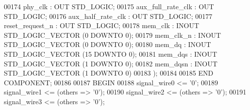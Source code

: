 \begin{DoxyCode}
{00174         phy_clk : \textcolor{keywordflow}{OUT} \textcolor{comment}{STD\_LOGIC};
00175         aux_full_rate_clk   : \textcolor{keywordflow}{OUT} \textcolor{comment}{STD\_LOGIC};
00176         aux_half_rate_clk   : \textcolor{keywordflow}{OUT} \textcolor{comment}{STD\_LOGIC};
00177         reset_request_n : \textcolor{keywordflow}{OUT} \textcolor{comment}{STD\_LOGIC};
00178         mem_clk : \textcolor{keywordflow}{INOUT} \textcolor{comment}{STD\_LOGIC\_VECTOR} (\textcolor{vhdllogic}{}\textcolor{vhdllogic}{0} \textcolor{keywordflow}{DOWNTO} \textcolor{vhdllogic}{}\textcolor{vhdllogic}{0});
00179         mem_clk_n   : \textcolor{keywordflow}{INOUT} \textcolor{comment}{STD\_LOGIC\_VECTOR} (\textcolor{vhdllogic}{}\textcolor{vhdllogic}{0} \textcolor{keywordflow}{DOWNTO} \textcolor{vhdllogic}{}\textcolor{vhdllogic}{0});
00180         mem_dq  : \textcolor{keywordflow}{INOUT} \textcolor{comment}{STD\_LOGIC\_VECTOR} (\textcolor{vhdllogic}{}\textcolor{vhdllogic}{15} \textcolor{keywordflow}{DOWNTO} \textcolor{vhdllogic}{}\textcolor{vhdllogic}{0});
00181         mem_dqs : \textcolor{keywordflow}{INOUT} \textcolor{comment}{STD\_LOGIC\_VECTOR} (\textcolor{vhdllogic}{}\textcolor{vhdllogic}{1} \textcolor{keywordflow}{DOWNTO} \textcolor{vhdllogic}{}\textcolor{vhdllogic}{0});
00182         mem_dqsn    : \textcolor{keywordflow}{INOUT} \textcolor{comment}{STD\_LOGIC\_VECTOR} (\textcolor{vhdllogic}{}\textcolor{vhdllogic}{1} \textcolor{keywordflow}{DOWNTO} \textcolor{vhdllogic}{}\textcolor{vhdllogic}{0})
00183     );
00184 
00185     \textcolor{keywordflow}{END} \textcolor{keywordflow}{COMPONENT};
00186 
00187 \textcolor{vhdlkeyword}{BEGIN}
00188     \textcolor{keywordflow}{signal}\textcolor{vhdlchar}{\_wire0}  \textcolor{vhdlchar}{<=}  \textcolor{vhdlchar}{'}\textcolor{vhdllogic}{}\textcolor{vhdllogic}{0}\textcolor{vhdlchar}{'};
00189     \textcolor{keywordflow}{signal}\textcolor{vhdlchar}{\_wire1}  \textcolor{vhdlchar}{<=} \textcolor{vhdlchar}{(}\textcolor{keywordflow}{others} \textcolor{vhdlchar}{=}\textcolor{vhdlchar}{>} \textcolor{vhdlchar}{'}\textcolor{vhdllogic}{}\textcolor{vhdllogic}{0}\textcolor{vhdlchar}{'}\textcolor{vhdlchar}{)};
00190     \textcolor{keywordflow}{signal}\textcolor{vhdlchar}{\_wire2}  \textcolor{vhdlchar}{<=} \textcolor{vhdlchar}{(}\textcolor{keywordflow}{others} \textcolor{vhdlchar}{=}\textcolor{vhdlchar}{>} \textcolor{vhdlchar}{'}\textcolor{vhdllogic}{}\textcolor{vhdllogic}{0}\textcolor{vhdlchar}{'}\textcolor{vhdlchar}{)};
00191     \textcolor{keywordflow}{signal}\textcolor{vhdlchar}{\_wire3}  \textcolor{vhdlchar}{<=} \textcolor{vhdlchar}{(}\textcolor{keywordflow}{others} \textcolor{vhdlchar}{=}\textcolor{vhdlchar}{>} \textcolor{vhdlchar}{'}\textcolor{vhdllogic}{}\textcolor{vhdllogic}{0}\textcolor{vhdlchar}{'}\textcolor{vhdlchar}{)};
}
\end{DoxyCode}
